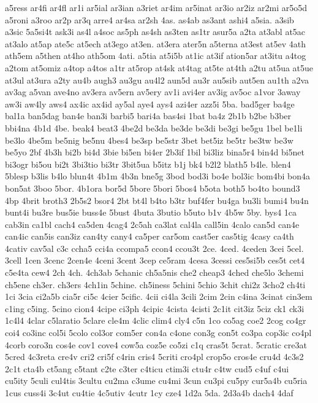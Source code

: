 {a5ress
ar4fi
ar4fl
ar1i
ar5ial
ar3ian
a3riet
ar4im
ar5inat
ar3io
ar2iz
ar2mi
ar5o5d
a5roni
a3roo
ar2p
ar3q
arre4
ar4sa
ar2sh
4as.
as4ab
as3ant
ashi4
a5sia.
a3sib
a3sic
5a5si4t
ask3i
as4l
a4soc
as5ph
as4sh
as3ten
as1tr
asur5a
a2ta
at3abl
at5ac
at3alo
at5ap
ate5c
at5ech
at3ego
at3en.
at3era
ater5n
a5terna
at3est
at5ev
4ath
ath5em
a5then
at4ho
ath5om
4ati.
a5tia
at5i5b
at1ic
at3if
ation5ar
at3itu
a4tog
a2tom
at5omiz
a4top
a4tos
a1tr
at5rop
at4sk
at4tag
at5te
at4th
a2tu
at5ua
at5ue
at3ul
at3ura
a2ty
au4b
augh3
au3gu
au4l2
aun5d
au3r
au5sib
aut5en
au1th
a2va
av3ag
a5van
ave4no
av3era
av5ern
av5ery
av1i
avi4er
av3ig
av5oc
a1vor
3away
aw3i
aw4ly
aws4
ax4ic
ax4id
ay5al
aye4
ays4
azi4er
azz5i
5ba.
bad5ger
ba4ge
bal1a
ban5dag
ban4e
ban3i
barbi5
bari4a
bas4si
1bat
ba4z
2b1b
b2be
b3ber
bbi4na
4b1d
4be.
beak4
beat3
4be2d
be3da
be3de
be3di
be3gi
be5gu
1bel
be1li
be3lo
4be5m
be5nig
be5nu
4bes4
be3sp
be5str
3bet
bet5iz
be5tr
be3tw
be3w
be5yo
2bf
4b3h
bi2b
bi4d
3bie
bi5en
bi4er
2b3if
1bil
bi3liz
bina5r4
bin4d
bi5net
bi3ogr
bi5ou
bi2t
3bi3tio
bi3tr
3bit5ua
b5itz
b1j
bk4
b2l2
blath5
b4le.
blen4
5blesp
b3lis
b4lo
blun4t
4b1m
4b3n
bne5g
3bod
bod3i
bo4e
bol3ic
bom4bi
bon4a
bon5at
3boo
5bor.
4b1ora
bor5d
5bore
5bori
5bos4
b5ota
both5
bo4to
bound3
4bp
4brit
broth3
2b5s2
bsor4
2bt
bt4l
b4to
b3tr
buf4fer
bu4ga
bu3li
bumi4
bu4n
bunt4i
bu3re
bus5ie
buss4e
5bust
4buta
3butio
b5uto
b1v
4b5w
5by.
bys4
1ca
cab3in
ca1bl
cach4
ca5den
4cag4
2c5ah
ca3lat
cal4la
call5in
4calo
can5d
can4e
can4ic
can5is
can3iz
can4ty
cany4
ca5per
car5om
cast5er
cas5tig
4casy
ca4th
4cativ
cav5al
c3c
ccha5
cci4a
ccompa5
ccon4
ccou3t
2ce.
4ced.
4ceden
3cei
5cel.
3cell
1cen
3cenc
2cen4e
4ceni
3cent
3cep
ce5ram
4cesa
3cessi
ces5si5b
ces5t
cet4
c5e4ta
cew4
2ch
4ch.
4ch3ab
5chanic
ch5a5nis
che2
cheap3
4ched
che5lo
3chemi
ch5ene
ch3er.
ch3ers
4ch1in
5chine.
ch5iness
5chini
5chio
3chit
chi2z
3cho2
ch4ti
1ci
3cia
ci2a5b
cia5r
ci5c
4cier
5cific.
4cii
ci4la
3cili
2cim
2cin
c4ina
3cinat
cin3em
c1ing
c5ing.
5cino
cion4
4cipe
ci3ph
4cipic
4cista
4cisti
2c1it
cit3iz
5ciz
ck1
ck3i
1c4l4
4clar
c5laratio
5clare
cle4m
4clic
clim4
cly4
c5n
1co
co5ag
coe2
2cog
co4gr
coi4
co3inc
col5i
5colo
col3or
com5er
con4a
c4one
con3g
con5t
co3pa
cop3ic
co4pl
4corb
coro3n
cos4e
cov1
cove4
cow5a
coz5e
co5zi
c1q
cras5t
5crat.
5cratic
cre3at
5cred
4c3reta
cre4v
cri2
cri5f
c4rin
cris4
5criti
cro4pl
crop5o
cros4e
cru4d
4c3s2
2c1t
cta4b
ct5ang
c5tant
c2te
c3ter
c4ticu
ctim3i
ctu4r
c4tw
cud5
c4uf
c4ui
cu5ity
5culi
cul4tis
3cultu
cu2ma
c3ume
cu4mi
3cun
cu3pi
cu5py
cur5a4b
cu5ria
1cus
cuss4i
3c4ut
cu4tie
4c5utiv
4cutr
1cy
cze4
1d2a
5da.
2d3a4b
dach4
4daf
}
